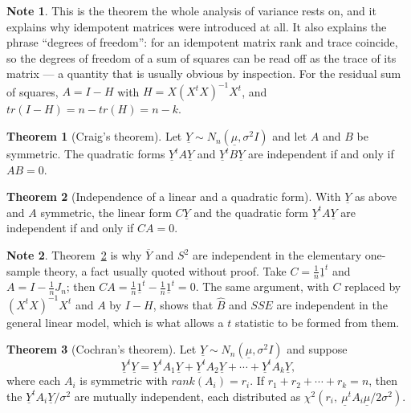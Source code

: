 \documentclass[11pt,a4paper]{article}
\theoremstyle{definition}
\newtheorem{thm}{Theorem}[subsection]
\newtheorem*{note}{Note}
\begin{document}
\begin{note}
This is the theorem the whole analysis of variance rests on, and it explains
why idempotent matrices were introduced at all. It also explains the phrase
``degrees of freedom'': for an idempotent matrix rank and trace coincide, so
the degrees of freedom of a sum of squares can be read off as the trace of its
matrix --- a quantity that is usually obvious by inspection. For the residual
sum of squares, $A=I-H$ with $H=X\left(X^tX\right)^{-1}X^t$, and
$tr(I-H)=n-tr(H)=n-k$.
\end{note}

\begin{thm}[Craig's theorem]
\label{res:thm:craig}
Let $\underline{Y}\sim N_n\left(\underline{\mu},\sigma^2I\right)$ and let $A$
and $B$ be symmetric. The quadratic forms $\underline{Y}^tA\underline{Y}$ and
$\underline{Y}^tB\underline{Y}$ are independent if and only if $AB=0$.
\end{thm}

\begin{thm}[Independence of a linear and a quadratic form]
\label{res:thm:linquad}
With $\underline{Y}$ as above and $A$ symmetric, the linear form
$C\underline{Y}$ and the quadratic form $\underline{Y}^tA\underline{Y}$ are
independent if and only if $CA=0$.
\end{thm}

\begin{note}
Theorem~\ref{res:thm:linquad} is why $\overline{Y}$ and $S^2$ are independent
in the elementary one-sample theory, a fact usually quoted without proof. Take
$C=\tfrac{1}{n}\underline{1}^t$ and $A=I-\tfrac{1}{n}J_n$; then
$CA=\tfrac{1}{n}\underline{1}^t-\tfrac{1}{n}\underline{1}^t=0$. The same
argument, with $C$ replaced by $\left(X^tX\right)^{-1}X^t$ and $A$ by $I-H$,
shows that $\widehat{B}$ and $SSE$ are independent in the general linear
model, which is what allows a $t$ statistic to be formed from them.
\end{note}

\begin{thm}[Cochran's theorem]
\label{res:thm:cochran}
Let $\underline{Y}\sim N_n\left(\underline{\mu},\sigma^2I\right)$ and suppose
$$\underline{Y}^t\underline{Y}=\underline{Y}^tA_1\underline{Y}
+\underline{Y}^tA_2\underline{Y}+\cdots+\underline{Y}^tA_k\underline{Y},$$
where each $A_i$ is symmetric with $rank(A_i)=r_i$. If
$r_1+r_2+\cdots+r_k=n$, then the $\underline{Y}^tA_i\underline{Y}/\sigma^2$
are mutually independent, each distributed as
$\chi^2\left(r_i,\ \underline{\mu}^tA_i\underline{\mu}/2\sigma^2\right)$.
\end{thm}
\end{document}

